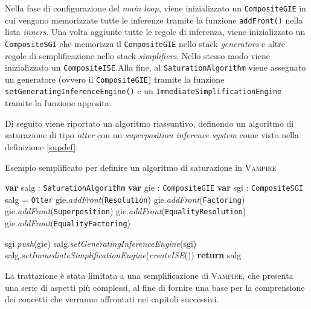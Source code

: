 Nella fase di configurazione del \emph{main loop}, viene inizializzato un \verb|CompositeGIE| in cui 
vengono memorizzate tutte le inferenze tramite la funzione \verb|addFront()| nella lista \emph{inners}.
Una volta aggiunte tutte le regole di inferenza, viene inizializzato un \verb|CompositeSGI| che memorizza
il \verb|CompositeGIE| nello stack \emph{generators} e altre regole di semplificazione nello stack \emph{simplifiers}.
Nello stesso modo viene inizializzato un \verb|CompositeISE|.Alla fine, al \verb|SaturationAlgorithm| viene assegnato un generatore (ovvero il \verb|CompositeGIE|)
tramite la funzione \verb|setGeneratingInferenceEngine()| e un \verb|ImmediateSimplificationEngine| tramite la funzione 
apposita. 
\begin{example}
    Di seguito viene riportato un algoritmo riassuntivo, definendo un algoritmo di saturazione di tipo \emph{otter} con un \emph{superposition inference system} come visto 
nella definizione \ref{supdef}:
\begin{algorithm}
    \caption{Esempio semplificato per definire un algoritmo di saturazione in \textsc{Vampire}}
    \begin{algorithmic}
        \State \textbf{var} salg : \verb|SaturationAlgorithm|
        \State \textbf{var} gie : \verb|CompositeGIE|
        \State \textbf{var} sgi : \verb|CompositeSGI|
        \State salg = \verb|Otter|
        \State gie.\emph{addFront}(\verb|Resolution|)
        \State gie.\emph{addFront}(\verb|Factoring|)
        \State gie.\emph{addFront}(\verb|Superposition|)
        \State gie.\emph{addFront}(\verb|EqualityResolution|)
        \State gie.\emph{addFront}(\verb|EqualityFactoring|)

        \State sgi.\emph{push}(gie)
        \State salg.\emph{setGeneratingInferenceEngine}(sgi)
        \State salg.\emph{setImmediateSimplificationEngine}(\emph{createISE}())
        \State \textbf{return} salg
        \EndFunction
    \end{algorithmic}
\end{algorithm}
\end{example}
La trattazione è stata limitata a una semplificazione di \textsc{Vampire}, che presenta una 
serie di aspetti più complessi, al fine di fornire una base 
per la comprensione dei concetti che verranno affrontati nei capitoli successivi. 


